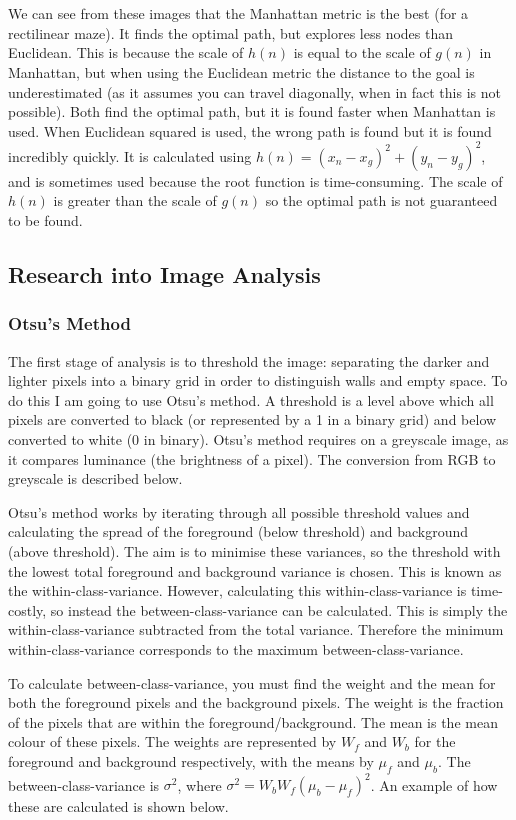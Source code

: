\documentclass[titlepage]{article}
\begin{document}
\\\\
We can see from these images that the Manhattan metric is the best (for a rectilinear maze). It finds the optimal path, but explores less nodes than Euclidean. This is because the scale of $h(n)$ is equal to the scale of $g(n)$ in Manhattan, but when using the Euclidean metric the distance to the goal is underestimated (as it assumes you can travel diagonally, when in fact this is not possible). Both find the optimal path, but it is found faster when Manhattan is used. When Euclidean squared is used, the wrong path is found but it is found incredibly quickly. It is calculated using $h(n) = (x_n-x_g)^2 + (y_n-y_g)^2$, and is sometimes used because the root function is time-consuming. The scale of $h(n)$ is greater than the scale of $g(n)$ so the optimal path is not guaranteed to be found. 


\subsection{Research into Image Analysis}
\subsubsection{Otsu's Method}
The first stage of analysis is to threshold the image: separating the darker and lighter pixels into a binary grid in order to distinguish walls and empty space. To do this I am going to use Otsu's method. A threshold is a level above which all pixels are converted to black (or represented by a 1 in a binary grid) and below converted to white (0 in binary). Otsu's method requires on a greyscale image, as it compares luminance (the brightness of a pixel). The conversion from RGB to greyscale is described below.

Otsu's method works by iterating through all possible threshold values and calculating the spread of the foreground (below threshold) and background (above threshold). The aim is to minimise these variances, so the threshold with the lowest total foreground and background variance is chosen. This is known as the within-class-variance. However, calculating this within-class-variance is time-costly, so instead the between-class-variance can be calculated. This is simply the within-class-variance subtracted from the total variance. Therefore the minimum within-class-variance corresponds to the maximum between-class-variance.

To calculate between-class-variance, you must find the weight and the mean for both the foreground pixels and the background pixels. The weight is the fraction of the pixels that are within the foreground/background. The mean is the mean colour of these pixels. The weights are represented by $W_f$ and $W_b$ for the foreground and background respectively, with the means by $\mu_f$ and $\mu_b$. The between-class-variance is $\sigma^2$, where $\sigma^2 = W_b W_f (\mu_b - \mu_f)^2$. An example of how these are calculated is shown below.
\end{document}
